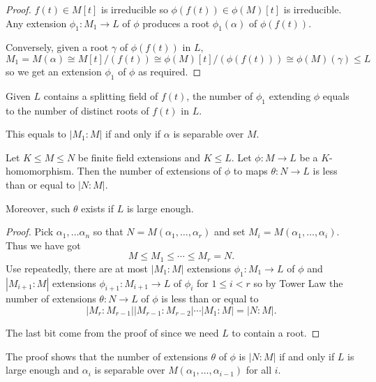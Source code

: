 \documentclass[a4paper]{article}
\begin{document}
\begin{proof}
  \(f(t) \in M[t]\) is irreducible so \(\phi(f(t)) \in \phi(M)[t]\) is irreducible. Any extension \(\phi_1: M_1 \to L\) of \(\phi\) produces a root \(\phi_1(\alpha)\) of \(\phi(f(t))\).

  Conversely, given a root \(\gamma\) of \(\phi(f(t))\) in \(L\),
  \[
    M_1 = M(\alpha) \cong M[t]/(f(t)) \cong \phi(M)[t]/(\phi(f(t))) \cong \phi(M)(\gamma) \leq L
  \]
  so we get an extension \(\phi_1\) of \(\phi\) as required.
\end{proof}

\begin{corollary}
  Given \(L\) contains a splitting field of \(f(t)\), the number of \(\phi_1\) extending \(\phi\) equals to the number of distinct roots of \(f(t)\) in \(L\).

  This equals to \(|M_1:M|\) if and only if \(\alpha\) is separable over \(M\).
\end{corollary}

\begin{corollary}
  \label{cor:homomorphic extension of finite extension}
  Let \(K \leq M \leq N\) be finite field extensions and \(K \leq L\). Let \(\phi: M \to L\) be a \(K\)-homomorphism. Then the number of extensions of \(\phi\) to maps \(\theta: N \to L\) is less than or equal to \(|N:M|\).

  Moreover, such \(\theta\) exists if \(L\) is large enough.
\end{corollary}

\begin{proof}
  Pick \(\alpha_1, \dots \alpha_n\) so that \(N = M(\alpha_1, \dots, \alpha_r)\) and set \(M_i = M(\alpha_1, \dots, \alpha_i)\). Thus we have got
  \[
    M \leq M_1 \leq \cdots \leq M_r = N.
  \]
  Use  repeatedly, there are at most \(|M_1:M|\) extensions \(\phi_1: M_1 \to L\) of \(\phi\) and \(|M_{i + 1}:M|\) extensions \(\phi_{i + 1}: M_{i + 1} \to L\) of \(\phi_i\) for \(1 \leq i < r\) so by Tower Law the number of extensions \(\theta: N \to L\) of \(\phi\) is less than or equal to
  \[
    |M_r:M_{r - 1}||M_{r - 1}:M_{r - 2}|\cdots|M_1:M| = |N:M|.
  \]

  The last bit come from the proof of  since we need \(L\) to contain a root.
\end{proof}

\begin{remark}
  The proof shows that the number of extensions \(\theta\) of \(\phi\) is \(|N:M|\) if and only if \(L\) is large enough and \(\alpha_i\) is separable over \(M(\alpha_1, \dots, \alpha_{i - 1})\) for all \(i\).
\end{remark}
\end{document}
